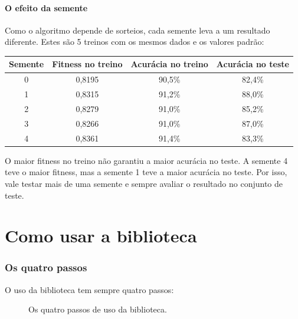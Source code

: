 \documentclass[11pt,a4paper]{article}
\newenvironment{tabela}{\par\nopagebreak[4]\vspace{0.3em}\nopagebreak[4]\begingroup\centering\small}{\par\endgroup\vspace{0.6em}}
\begin{document}
\subsection{O efeito da semente}

Como o algoritmo depende de sorteios, cada semente leva a um resultado diferente. Estes são 5 treinos com os mesmos dados e os valores padrão:

\begin{tabela}
\begin{tabular}{cccc}
\toprule
Semente & Fitness no treino & Acurácia no treino & Acurácia no teste\\
\midrule
0 & 0,8195 & 90,5\% & 82,4\%\\
1 & 0,8315 & 91,2\% & 88,0\%\\
2 & 0,8279 & 91,0\% & 85,2\%\\
3 & 0,8266 & 91,0\% & 87,0\%\\
4 & 0,8361 & 91,4\% & 83,3\%\\
\bottomrule
\end{tabular}
\end{tabela}

O maior fitness no treino não garantiu a maior acurácia no teste. A semente 4 teve o maior fitness, mas a semente 1 teve a maior acurácia no teste. Por isso, vale testar mais de uma semente e sempre avaliar o resultado no conjunto de teste.

\clearpage
\part{Como usar a biblioteca}

\section{Os quatro passos}

O uso da biblioteca tem sempre quatro passos:

\begin{figure}[H]
\centering
{}
\caption{Os quatro passos de uso da biblioteca.}
\label{fig:passos}
\end{figure}
\end{document}
